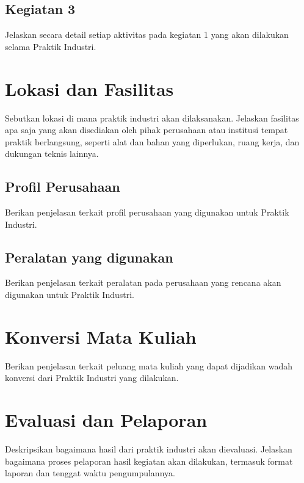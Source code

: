 \subsection{Kegiatan 3}
Jelaskan secara detail setiap aktivitas pada kegiatan 1 yang akan dilakukan selama Praktik Industri.

\section{Lokasi dan Fasilitas}
Sebutkan lokasi di mana praktik industri akan dilaksanakan. Jelaskan fasilitas apa saja yang akan disediakan oleh pihak perusahaan atau institusi tempat praktik berlangsung, seperti alat dan bahan yang diperlukan, ruang kerja, dan dukungan teknis lainnya.

\subsection{Profil Perusahaan \perusahaan}
Berikan penjelasan terkait profil perusahaan yang digunakan untuk Praktik Industri.

\subsection{Peralatan yang digunakan}
Berikan penjelasan terkait peralatan pada perusahaan yang rencana akan digunakan untuk Praktik Industri.

\section{Konversi Mata Kuliah}
Berikan penjelasan terkait peluang mata kuliah yang dapat dijadikan wadah konversi dari Praktik Industri yang dilakukan.

\section{Evaluasi dan Pelaporan}
Deskripsikan bagaimana hasil dari praktik industri akan dievaluasi. Jelaskan bagaimana proses pelaporan hasil kegiatan akan dilakukan, termasuk format laporan dan tenggat waktu pengumpulannya.